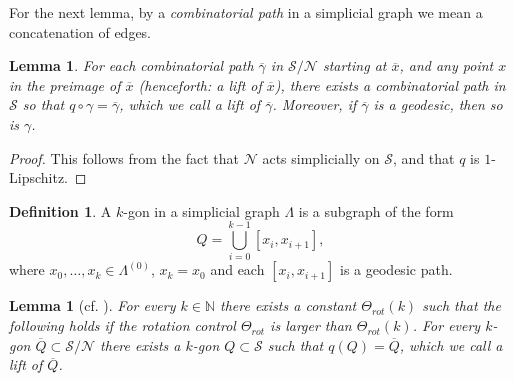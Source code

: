 \documentclass[svgnames]{amsart}
\theoremstyle{plain}
\newtheorem{lemma}[thm]{Lemma}
\theoremstyle{definition}
\newtheorem{defn}[thm]{Definition}
\newcommand{\ov}[1]{\overline{#1}}
\newcommand{\N}{\mathcal{N}}
\newcommand{\calS}{\mathcal{S}}
\begin{document}
For the next lemma, by a \emph{combinatorial path} in a simplicial graph we mean a concatenation of edges.



\begin{lemma}\label{lem:geodesic_lifts} For each combinatorial path $\ov\gamma$ in $\calS/\N$ starting at $\ov x$, and any point $x$ in the preimage of $\ov x$ (henceforth: a lift of $\ov x$), there exists a combinatorial path in $\calS$ so that $q\circ\gamma=\ov \gamma$, which we call a lift of $\ov\gamma$. Moreover, if $\ov\gamma$ is a geodesic, then so is $\gamma$.
\end{lemma}

\begin{proof}
    This follows from the fact that $\N$ acts simplicially on $\calS$, and that $q$ is $1$-Lipschitz.
\end{proof}




\begin{defn}\label{def:kgon_generic}
    A $k$-gon in a simplicial graph $\Lambda$ is a subgraph of the form
    $$Q=\bigcup_{i=0}^{k-1}[x_i, x_{i+1}],$$
    where $x_0,\ldots,x_{k}\in\Lambda^{(0)}$, $x_{k}=x_0$ and each $[x_i, x_{i+1}]$ is a geodesic path.
\end{defn}


\begin{lemma}[{cf. \cite[Proposition 4.3]{dfdt}}]\label{lem:rotating_lift_mgons}
    For every $k\in\mathbb{N}$ there exists a constant $\Theta_{rot}(k)$ such that the following holds if the rotation control $\Theta_{rot}$ is larger than $\Theta_{rot}(k)$. For every $k$-gon $\ov{Q}\subset \calS/\N$ there exists a $k$-gon $Q\subset \calS$ such that $q(Q)=\ov Q$, which we call a \emph{lift} of $\ov Q$.
\end{lemma}
\end{document}
